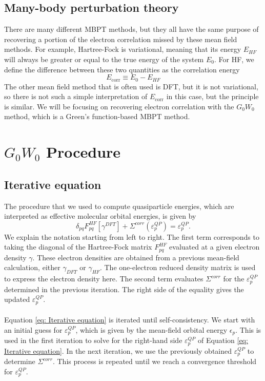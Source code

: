 \documentclass[12pt]{caltech_thesis}
\begin{document}
\section{Many-body perturbation theory}
There are many different MBPT methods, but they all have the same purpose of recovering a portion of the electron correlation missed by these mean field methods. For example, Hartree-Fock is variational, meaning that its energy $E_{HF}$ will always be greater or equal to the true energy of the system $E_0$. For HF, we define the difference between these two quantities as the correlation energy
\begin{equation}
    E_{\text{corr}} \equiv E_0 - E_{HF}
\end{equation}
The other mean field method that is often used is DFT, but it is not variational, so there is not such a simple interpretation of $E_{\text{corr}}$ in this case, but the principle is similar. We will be focusing on recovering electron correlation with the $G_0W_0$ method, which is a Green's function-based MBPT method.



\chapter{$G_0W_0$ Procedure}
\section{Iterative equation}
The procedure that we used to compute quasiparticle energies, which are interpreted as effective molecular orbital energies, is given by 
\begin{equation}
    \delta_{pq}F_{pq}^{HF}[\gamma^{DFT}] + \Sigma^{corr}(\varepsilon_{p}^{QP}) = \varepsilon_{p}^{QP}.
\label{eq: Iterative equation}
\end{equation}
We explain the notation starting from left to right. The first term corresponds to taking the diagonal of the Hartree-Fock matrix $F_{pq}^{HF}$ evaluated at a given electron density $\gamma$. These electron densities are obtained from a previous mean-field calculation, either $\gamma_{DFT}$ or $\gamma_{HF}$. The one-electron reduced density matrix is used to express the electron density here. The second term evaluates $\Sigma^{corr}$ for the $\varepsilon_{p}^{QP}$ determined in the previous iteration. The right side of the equality gives the updated $\varepsilon_{p}^{QP}$.\\\\ Equation \ref{eq: Iterative equation} is iterated until self-consistency. We start with an initial guess for $\varepsilon_{p}^{QP}$, which is given by the mean-field orbital energy $\epsilon_p$. This is used in the first iteration to solve for the right-hand side $\varepsilon_{p}^{QP}$ of Equation \ref{eq: Iterative equation}. In the next iteration, we use the previously obtained $\varepsilon_{p}^{QP}$ to determine $\Sigma^{corr}$. This process is repeated until we reach a convergence threshold for $\varepsilon_{p}^{QP}$.
\end{document}
